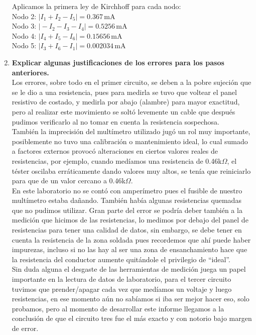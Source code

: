 \documentclass[a4paper,12pt]{report}
\begin{document}
\begin{enumerate}
$$$$
Aplicamos la primera ley de Kirchhoff para cada nodo:\\
Nodo 2: $\vert I_{1} + I_{2} - I_{5} \vert  = 0.367\,\mathrm{mA}$\\
Nodo 3: $\vert -I_{2} - I_{3} - I_{4} \vert  = 0.5256\,\mathrm{mA}$\\
Nodo 4: $\vert I_{4} + I_{5} - I_{6} \vert  = 0.15656\,\mathrm{mA}$\\
Nodo 5: $\vert I_{3} + I_{6} - I_{1} \vert  = 0.002034\,\mathrm{mA}$
\item \textbf{Explicar algunas justificaciones de los errores para los pasos anteriores.}\\
Los errores, sobre todo en el primer circuito, se deben a la pobre sujeción que se le dio a una resistencia, pues para medirla se tuvo que voltear el panel resistivo de costado, y medirla por abajo (alambre) para mayor exactitud, pero al realizar este movimiento se soltó levemente un cable que después pudimos verificarlo al no tomar en cuenta la resistencia sospechosa.\\
También la imprecisión del multímetro utilizado jugó un rol muy importante, posiblemente no tuvo una calibración o mantenimiento ideal, lo cual sumado a factores externos provocó alteraciones en ciertos valores reales de resistencias, por ejemplo, cuando medíamos una resistencia de 0.46k$\Omega$, el téster oscilaba erráticamente dando valores muy altos, se tenía que reiniciarlo para que de un valor cercano a 0.46k$\Omega$.\\
En este laboratorio no se contó con amperímetro pues el fusible de nuestro multímetro estaba dañando. También había algunas resistencias quemadas que no pudimos utilizar. Gran parte del error se podría deber también a la medición que hicimos de las resistencias, lo medimos por debajo del panel de resistencias para tener una calidad de datos, sin embargo, se debe tener en cuenta la resistencia de la zona soldada pues recordemos que ahí puede haber impurezas, incluso si no las hay al ser una zona de ensanchamiento hace que la resistencia del conductor aumente quitándole el privilegio de ``ideal''.\\
Sin duda alguna el desgaste de las herramientas de medición juega un papel importante en la lectura de datos de laboratorio, para el tercer circuito tuvimos que prender/apagar cada vez que medíamos un voltaje y luego resistencias, en ese momento aún no sabíamos si iba ser mejor hacer eso, solo probamos, pero al momento de desarrollar este informe llegamos a la conclusión de que el circuito tres fue el más exacto y con notorio bajo margen de error.

\end{enumerate}
\end{document}
